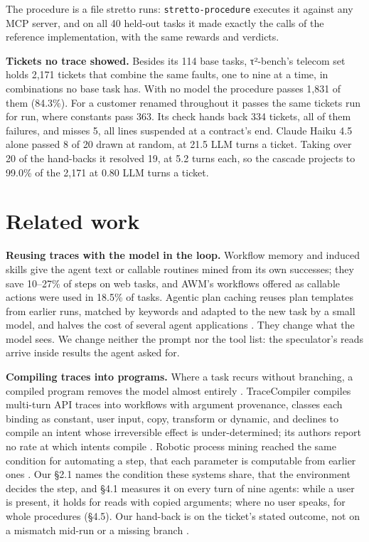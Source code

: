 \documentclass[10pt,twocolumn,letterpaper]{article}
\newcommand{\runin}[1]{{\sffamily\bfseries\color{accent}#1}}
\begin{document}
The procedure is a file stretto runs: \texttt{stretto-procedure} executes it against any MCP server, and on all 40 held-out tasks it made exactly the calls of the reference implementation, with the same rewards and verdicts.

\runin{Tickets no trace showed.} Besides its 114 base tasks, τ²-bench's telecom set holds 2,171 tickets that combine the same faults, one to nine at a time, in combinations no base task has. With no model the procedure passes 1,831 of them (84.3\%). For a customer renamed throughout it passes the same tickets run for run, where constants pass 363. Its check hands back 334 tickets, all of them failures, and misses 5, all lines suspended at a contract's end. Claude Haiku 4.5 alone passed 8 of 20 drawn at random, at 21.5 LLM turns a ticket. Taking over 20 of the hand-backs it resolved 19, at 5.2 turns each, so the cascade projects to 99.0\% of the 2,171 at 0.80 LLM turns a ticket.

\hypertarget{related-work}{%
\section{Related work}\label{related-work}}

\runin{Reusing traces with the model in the loop.} Workflow memory \citep{wang2025awm} and induced skills \citep{wang2025asi, prabhu2025walt, zheng2025skillweaver} give the agent text or callable routines mined from its own successes; they save 10--27\% of steps on web tasks, and AWM's workflows offered as callable actions were used in 18.5\% of tasks. Agentic plan caching reuses plan templates from earlier runs, matched by keywords and adapted to the new task by a small model, and halves the cost of several agent applications \citep{zhang2025apc}. They change what the model sees. We change neither the prompt nor the tool list: the speculator's reads arrive inside results the agent asked for.

\runin{Compiling traces into programs.} Where a task recurs without branching, a compiled program removes the model almost entirely \citep{wang2026loop, trooskens2026compiledai, li2026preact}. TraceCompiler compiles multi-turn API traces into workflows with argument provenance, classes each binding as constant, user input, copy, transform or dynamic, and declines to compile an intent whose irreversible effect is under-determined; its authors report no rate at which intents compile \citep{elyadouni2026tracecompiler}. Robotic process mining reached the same condition for automating a step, that each parameter is computable from earlier ones \citep{bosco2019routines, leno2021routines}. Our §2.1 names the condition these systems share, that the environment decides the step, and §4.1 measures it on every turn of nine agents: while a user is present, it holds for reads with copied arguments; where no user speaks, for whole procedures (§4.5). Our hand-back is on the ticket's stated outcome, not on a mismatch mid-run \citep{li2026preact} or a missing branch \citep{elyadouni2026tracecompiler}.
\end{document}
